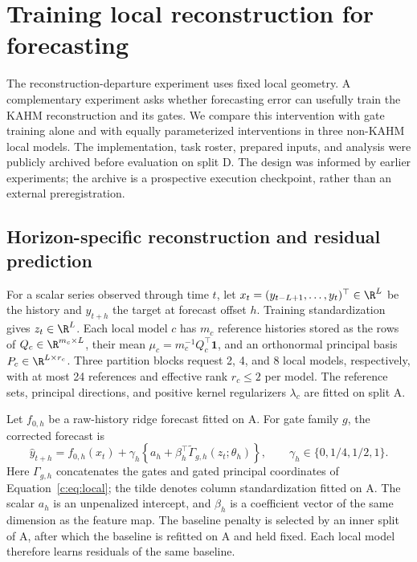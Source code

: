 \section{Training local reconstruction for forecasting}
\label{sec:direct-reconstruction}

The reconstruction-departure experiment uses fixed local geometry. A
complementary experiment asks whether forecasting error can usefully train
the KAHM reconstruction and its gates. We compare this intervention with
gate training alone and with equally parameterized interventions in three
non-KAHM local models. The implementation, task roster, prepared inputs,
and analysis were publicly archived before evaluation on split D. The
design was informed by earlier experiments; the archive is a prospective
execution checkpoint, rather than an external preregistration.

\subsection{Horizon-specific reconstruction and residual prediction}

For a scalar series observed through time $t$, let
$x_t=(y_{t-L+1},\ldots,y_t)^\top\in\R^L$ be the history and
$y_{t+h}$ the target at forecast offset $h$. Training standardization gives
$z_t\in\R^L$. Each local model $c$ has $m_c$ reference histories stored as
the rows of $Q_c\in\R^{m_c\times L}$, their mean
$\mu_c=m_c^{-1}Q_c^\top\mathbf1$, and an orthonormal principal basis
$P_c\in\R^{L\times r_c}$. Three partition blocks request 2, 4, and 8
local models, respectively, with at most 24 references and effective
rank $r_c\leq2$ per model. The reference sets, principal directions,
and positive kernel regularizers $\lambda_c$ are fitted on split A.

Let $f_{0,h}$ be a raw-history ridge forecast fitted on A. For gate family
$g$, the corrected forecast is
\begin{equation}
 \widehat y_{t+h}=f_{0,h}(x_t)+\gamma_h
 \left\{a_h+\beta_h^\top
       \widetilde\Gamma_{g,h}(z_t;\theta_h)\right\},
 \qquad \gamma_h\in\{0,1/4,1/2,1\}.
 \label{eq:direct-forecast}
\end{equation}
Here $\Gamma_{g,h}$ concatenates the gates and gated principal coordinates
of Equation~\eqref{c:eq:local}; the tilde denotes column standardization
fitted on A. The scalar $a_h$ is an unpenalized intercept, and $\beta_h$
is a coefficient vector of the same dimension as the feature map.
The baseline penalty is selected by an inner split of A, after which
the baseline is refitted on A and held fixed. Each local model therefore
learns residuals of the same baseline.

